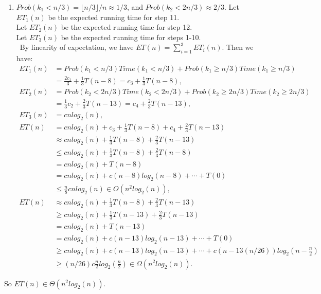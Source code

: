 \documentclass[10pt,oneside,reqno]{amsart}
\theoremstyle{plain}
\theoremstyle{definition}
\begin{document}
\begin{enumerate}[label=\arabic*.]
\begin{enumerate}
\item $Prob(k_1 < n/3) = \lfloor n/3 \rfloor/n \approx 1/3$, and $Prob(k_2 < 2n/3) \approx 2/3$. 
Let $ET_1(n)$ be the expected running time for step 11. \\
Let $ET_2(n)$ be the expected running time for step 12. \\
Let $ET_3(n)$ be the expected running time for steps 1-10. \\\
By linearity of expectation, we have $ET(n) = \sum_{i = 1}^3ET_i(n)$. 
Then we have: 
\begin{equation}
\begin{aligned}
ET_1(n) &= Prob(k_1 < n/3)Time(k_1<n/3) + Prob(k_1 \geq n/3)Time(k_1 \geq n/3)\\
&= \frac{2c_1}{3} + \frac{1}{3}T(n - 8) = c_3 + \frac{1}{3}T(n - 8),\\
ET_2(n) &= Prob(k_2 < 2n/3)Time(k_2<2n/3) + Prob(k_2 \geq 2n/3)Time(k_2 \geq 2n/3)\\
&= \frac{1}{3}c_2 + \frac{2}{3}T(n - 13) = c_4 + \frac{2}{3}T(n - 13),\\
ET_3(n) &= cnlog_2(n),\\
ET(n) &= cnlog_2(n) + c_3 + \frac{1}{3}T(n - 8) +  c_4 + \frac{2}{3}T(n - 13)\\
&\approx cnlog_2(n) + \frac{1}{3}T(n - 8) +  \frac{2}{3}T(n - 13)\\ 
&\leq cnlog_2(n) + \frac{1}{3}T(n - 8) +  \frac{2}{3}T(n - 8)\\
&= cnlog_2(n) + T(n - 8)\\
&= cnlog_2(n) + c(n - 8)log_2(n-8) + \cdots + T(0)\\
&\leq \frac{n}{8}cnlog_2(n) \in O(n^2log_2(n)),\\
ET(n) &\approx cnlog_2(n) + \frac{1}{3}T(n - 8) +  \frac{2}{3}T(n - 13)\\ 
&\geq cnlog_2(n) + \frac{1}{3}T(n - 13) +  \frac{2}{3}T(n - 13)\\ 
&= cnlog_2(n) + T(n - 13)\\
&= cnlog_2(n) + c(n - 13)log_2(n - 13) + \cdots + T(0)\\
&\geq cnlog_2(n) + c(n - 13)log_2(n - 13) + \cdots +c(n - 13(n/26))log_2(n - \frac{n}{2})\\
&\geq (n/26)c\frac{n}{2}log_2(\frac{n}{2}) \in \Omega (n^2log_2(n)). 
\end{aligned}
\end{equation}
\end{enumerate}
So $ET(n) \in \Theta(n^2log_2(n))$. \\


\end{enumerate}
\end{document}
